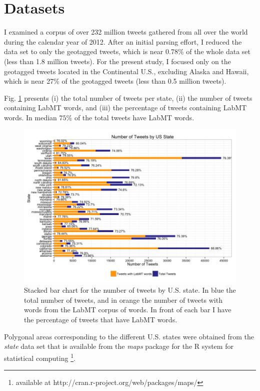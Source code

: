 \documentclass{llncs}
\begin{document}
\section{Datasets}
\label{sec:datasets}

I examined a corpus of over 232 million tweets gathered from all over the world during the calendar year of 2012. After an initial parsing effort, I reduced the data set to only the geotagged tweets, which is near 0.78\% of the whole data set (less than 1.8 million tweets). For the present study, I focused only on the geotagged tweets located in the Continental U.S., excluding Alaska and Hawaii, which is near 27\% of the geotagged tweets (less than 0.5 million tweets).

Fig. \ref{fig:tweets_by_state} presents (i) the total number of tweets per state, (ii) the number of tweets containing LabMT words, and (iii) the percentage of tweets containing LabMT words. In median $75\%$ of the total tweets have LabMT words.

\begin{figure}
\centering
\includegraphics[width=\textwidth]{images/tweets_by_state}
\caption{Stacked bar chart for the number of tweets by U.S. state. In blue the total number of tweets, and in orange the number of tweets with words from the LabMT corpus of words. In front of each bar I have the percentage of tweets that have LabMT words.}
\label{fig:tweets_by_state}
\end{figure}

Polygonal areas corresponding to the different U.S. states were obtained from the \emph{state} data set that is available from the \emph{maps} package for the R system for statistical computing \footnote{available at http://cran.r-project.org/web/packages/maps/}.
\end{document}
